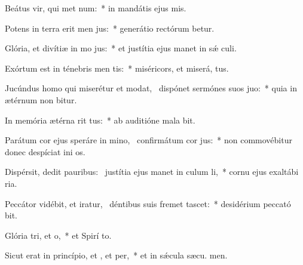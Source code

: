 \item Beátus vir, qui met num:~* in mandátis ejus  mis.
\item Potens in terra erit men jus:~* generátio rectórum betur.
\item Glória, et divítiæ in mo jus:~* et justítia ejus manet in sǽ culi.
\item Exórtum est in ténebris men tis:~* miséricors, et miserá,  tus.
\item Jucúndus homo qui miserétur et modat,~\pscross{} dispónet sermónes suos  juo:~* quia in ætérnum non bitur.
\item In memória ætérna rit tus:~* ab auditióne mala  bit.
\item Parátum cor ejus speráre in mino,~\pscross{} confirmátum  cor jus:~* non commovébitur donec despíciat ini os.
\item Dispérsit, dedit pauribus:~\pscross{} justítia ejus manet in culum li,~* cornu ejus exaltábi  ria.
\item Peccátor vidébit, et iratur,~\pscross{} déntibus suis fremet  tascet:~* desidérium peccató bit.
\item Glória tri, et o,~* et Spirí to.
\item Sicut erat in princípio, et , et per,~* et in sǽcula sæcu. men.
